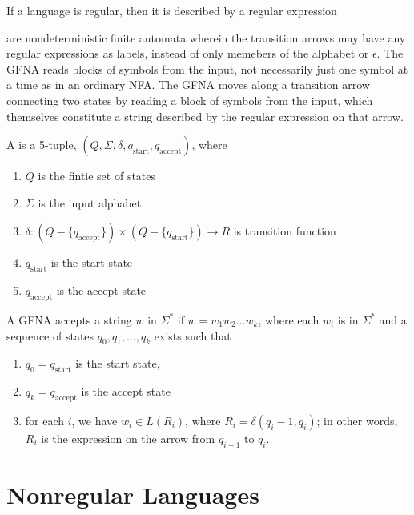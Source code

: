 \documentclass{article}
\begin{document}
\begin{lemma}
  If a language is regular, then it is described by a regular expression
\end{lemma}

\begin{definition}
  are nondeterministic finite automata wherein the transition arrows may have any regular expressions as labels, instead of only memebers of the alphabet or $\epsilon$. The GFNA reads blocks of symbols from the input, not necessarily just one symbol at a time as in an ordinary NFA. The GFNA moves along a transition arrow connecting two states by reading a block of symbols from the input, which themselves constitute a string described by the regular expression on that arrow.  
\end{definition}

\begin{definition}
  A  is a 5-tuple, $(Q,\Sigma,\delta,q_{\textrm{start}},q_{\textrm{accept}})$, where 
  \begin{enumerate}
    \item $Q$ is the fintie set of states 
    \item $\Sigma$ is the input alphabet 
    \item $\delta : (Q - \{q_{\textrm{accept}}\}) \times (Q - \{q_{\textrm{start}}\}) \rightarrow R$ is transition function
    \item $q_{\textrm{start}}$ is the start state 
    \item $q_{\textrm{accept}}$ is the accept state
  \end{enumerate}
\end{definition}

A GFNA accepts a string $w$ in $\Sigma^{*}$ if $w=w_1 w_2 \dots w_k$, where each $w_i$ is in $\Sigma^{*}$ and a sequence of states $q_0 , q_1 , \dots , q_k$ exists such that 
\begin{enumerate}
  \item $q_0 = q_{\textrm{start}}$ is the start state, 
  \item $q_k = q_{\textrm{accept}}$ is the accept state 
  \item for each $i$, we have $w_i \in L(R_i)$, where $R_i = \delta(q_i - 1, q_i)$; in other words, $R_i$ is the expression on the arrow from $q_{i-1}$ to $q_i$. 
\end{enumerate}

\section{Nonregular Languages}

\end{document}

